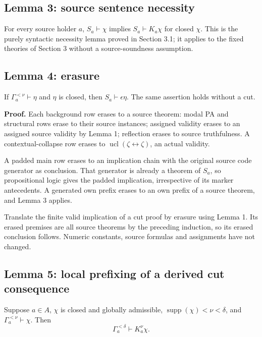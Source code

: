 \documentclass[
  11pt,
  letterpaper,
]{article}
\begin{document}
\subsection{Lemma 3: source sentence
necessity}\label{lemma-3-source-sentence-necessity}

For every source holder \(a\), \(S_a\vdash\chi\) implies
\(S_a\vdash K_a\chi\) for closed \(\chi\). This is the purely syntactic
necessity lemma proved in Section 3.1; it applies to the fixed theories
of Section 3 without a source-soundness assumption.

\subsection{Lemma 4: erasure}\label{lemma-4-erasure}

If \(\Gamma_a^{<\nu}\vdash\eta\) and \(\eta\) is closed, then
\(S_a\vdash\epsilon\eta\). The same assertion holds without a cut.

\textbf{Proof.} Each background row erases to a source theorem: modal PA
and structural rows erase to their source instances; assigned validity
erases to an assigned source validity by Lemma 1; reflection erases to
source truthfulness. A contextual-collapse row erases to
\(\operatorname{ucl}(\zeta\leftrightarrow\zeta)\), an actual validity.

A padded main row erases to an implication chain with the original
source code generator as conclusion. That generator is already a theorem
of \(S_a\), so propositional logic gives the padded implication,
irrespective of its marker antecedents. A generated own prefix erases to
an own prefix of a source theorem, and Lemma 3 applies.

Translate the finite valid implication of a cut proof by erasure using
Lemma 1. Its erased premises are all source theorems by the preceding
induction, so its erased conclusion follows. Numeric constants, source
formulas and assignments have not changed.

\subsection{Lemma 5: local prefixing of a derived cut
consequence}\label{lemma-5-local-prefixing-of-a-derived-cut-consequence}

Suppose \(a\in A\), \(\chi\) is closed and globally admissible,
\(\operatorname{supp}(\chi)<\nu<\delta\), and
\(\Gamma_a^{<\nu}\vdash\chi\). Then \[
\Gamma_a^{<\delta}\vdash K_a^\nu\chi.
\]
\end{document}
